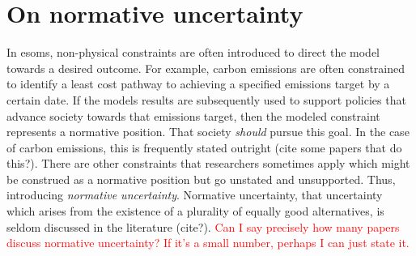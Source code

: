 \section{On normative uncertainty}
In \acp{esom}, non-physical constraints are often introduced to direct the model
towards a desired outcome. For example, carbon emissions are often constrained
to identify a least cost pathway to achieving a specified emissions target by a
certain date. If the models results are subsequently used to support policies
that advance society towards that emissions target, then the modeled constraint
represents a normative position. That society \textit{should} pursue this goal.
In the case of carbon emissions, this is frequently stated outright (cite some
papers that do this?). There are other constraints that researchers sometimes
apply which might be construed as a normative position but go unstated and
unsupported. Thus, introducing \textit{normative uncertainty}. Normative
uncertainty, that uncertainty which arises from the existence of a plurality of
equally good alternatives, is seldom discussed in the literature (cite?).
\textcolor{red}{Can I say precisely how many papers discuss normative
uncertainty? If it's a small number, perhaps I can just state it.}

